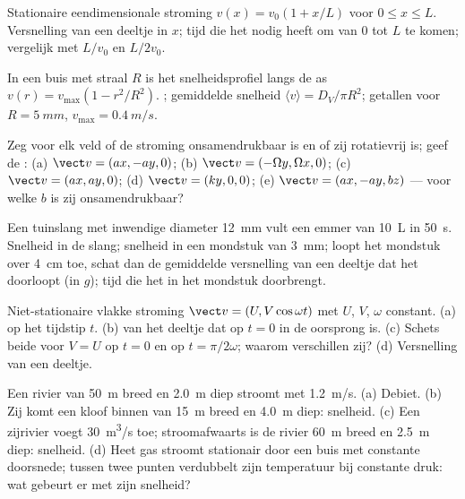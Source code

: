 \begin{exercise}[$\star$]\label{exo:b2:fluid-kinematics:2}
Stationaire eendimensionale stroming $v(x) = v_0(1 + x/L)$ voor
$0 \le x \le L$. Versnelling van een deeltje in $x$; tijd die het nodig
heeft om van $0$ tot $L$ te komen; vergelijk met $L/v_0$ en $L/2v_0$.
\end{exercise}

\begin{exercise}[$\star$]\label{exo:b2:fluid-kinematics:3}
In een buis met straal $R$ is het snelheidsprofiel langs de as
$v(r) = v_{\max}(1 -
r^2/R^2)$. ; gemiddelde snelheid
$\langle v\rangle
= D_V/\pi R^2$; getallen voor $R = \qty{5}{mm}$,
$v_{\max} = \qty{0.4}{m/s}$.
\end{exercise}

\begin{exercise}[$\star$]\label{exo:b2:fluid-kinematics:4}
Zeg voor elk veld of de stroming onsamendrukbaar is en of zij rotatievrij
is; geef de : (a) $\vect v = (ax, -ay, 0)$; (b)
$\vect v = (-\Omega y, \Omega x, 0)$; (c) $\vect v = (ax, ay, 0)$; (d)
$\vect v =
(ky, 0, 0)$; (e) $\vect v = (ax, -ay, bz)$ --- voor welke $b$ is
zij onsamendrukbaar?
\end{exercise}

\begin{exercise}[$\star\star$]\label{exo:b2:fluid-kinematics:5}
Een tuinslang met inwendige diameter \qty{12}{mm} vult een emmer van
\qty{10}{L} in \qty{50}{s}. Snelheid in de slang; snelheid in een mondstuk
van \qty{3}{mm}; loopt het mondstuk over \qty{4}{cm} toe, schat dan de
gemiddelde versnelling van een deeltje dat het doorloopt (in $g$); tijd die
het in het mondstuk doorbrengt.
\end{exercise}

\begin{exercise}[$\star\star$]\label{exo:b2:fluid-kinematics:6}
Niet-stationaire vlakke stroming $\vect v = (U, V\cos\omega t)$ met $U$,
$V$, $\omega$ constant. (a)  op het tijdstip $t$. (b) 
van het deeltje dat op $t = 0$ in de oorsprong is. (c) Schets beide voor
$V = U$ op $t = 0$ en op $t = \pi/2\omega$; waarom verschillen zij? (d)
Versnelling van een deeltje.
\end{exercise}

\begin{exercise}[$\star\star$]\label{exo:b2:fluid-kinematics:7}
Een rivier van \qty{50}{m} breed en \qty{2.0}{m} diep stroomt met
\qty{1.2}{m/s}. (a) Debiet. (b) Zij komt een kloof binnen van \qty{15}{m}
breed en \qty{4.0}{m} diep: snelheid. (c) Een zijrivier voegt
\qty{30}{m^3/s} toe; stroomafwaarts is de rivier \qty{60}{m} breed en
\qty{2.5}{m} diep: snelheid. (d) Heet gas stroomt stationair door een buis
met constante doorsnede; tussen twee punten verdubbelt zijn temperatuur bij
constante druk: wat gebeurt er met zijn snelheid?
\end{exercise}

